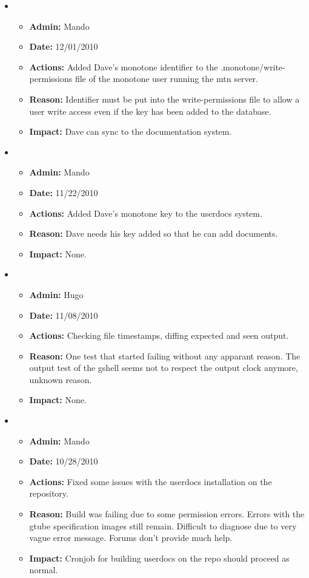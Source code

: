 \documentclass[12pt]{article}
\begin{document}
\begin{itemize}
\item
\begin{itemize}
\item[] {\bf Admin:} Mando
\item[] {\bf Date:} 12/01/2010 
\item[] {\bf Actions:} Added Dave's monotone identifier to the .monotone/write-permissions file of the monotone user running the mtn server.
\item[] {\bf Reason:} Identifier must be put into the write-permissions file to allow a user write access even if the key has been added to the database.
\item[] {\bf Impact:} Dave can sync to the documentation system.
\end{itemize}
	
\item
\begin{itemize}
\item[] {\bf Admin:} Mando
\item[] {\bf Date:} 11/22/2010 
\item[] {\bf Actions:} Added Dave's monotone key to the userdocs system.
\item[] {\bf Reason:} Dave needs his key added so that he can add documents.
\item[] {\bf Impact:} None.
\end{itemize}
	
\item
\begin{itemize}
\item[] {\bf Admin:} Hugo
\item[] {\bf Date:} 11/08/2010 
\item[] {\bf Actions:} Checking file timestamps, diffing expected and seen output.
\item[] {\bf Reason:} One test that started failing without any
  apparant reason.  The output test of the gshell seems not to respect
  the output clock anymore, unknown reason.
\item[] {\bf Impact:} None.
\end{itemize}	

\item
\begin{itemize}
\item[] {\bf Admin:} Mando
\item[] {\bf Date:} 10/28/2010 
\item[] {\bf Actions:} Fixed some issues with the userdocs installation on the repository. 
\item[] {\bf Reason:} Build was failing due to some permission errors. Errors with the gtube specification images still remain. Difficult to diagnose due to very vague error message. Forums don't provide much help.
\item[] {\bf Impact:} Cronjob for building userdocs on the repo should proceed as normal.
\end{itemize}	


\end{itemize}
\end{document}

